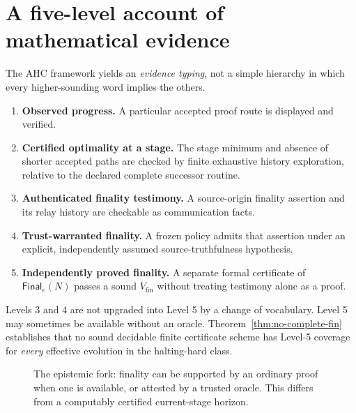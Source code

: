 \documentclass[11pt,letterpaper]{article}
\theoremstyle{definition}
\theoremstyle{remark}
\newcommand{\Fin}{\mathsf{Final}}
\begin{document}
\section{A five-level account of mathematical evidence}
The AHC framework yields an \emph{evidence typing}, not a simple hierarchy in which every higher-sounding word implies the others.
\begin{enumerate}[label=\textbf{Level \arabic*.},leftmargin=19mm]
\item \textbf{Observed progress.} A particular accepted proof route is displayed and verified.
\item \textbf{Certified optimality at a stage.} The stage minimum and absence of shorter accepted paths are checked by finite exhaustive history exploration, relative to the declared complete successor routine.
\item \textbf{Authenticated finality testimony.} A source-origin finality assertion and its relay history are checkable as communication facts.
\item \textbf{Trust-warranted finality.} A frozen policy admits that assertion under an explicit, independently assumed source-truthfulness hypothesis.
\item \textbf{Independently proved finality.} A separate formal certificate of $\Fin_e(N)$ passes a sound $V_{\mathrm{fin}}$ without treating testimony alone as a proof.
\end{enumerate}
Levels 3 and 4 are not upgraded into Level 5 by a change of vocabulary. Level 5 may sometimes be available without an oracle. Theorem~\ref{thm:no-complete-fin} establishes that no sound decidable finite certificate scheme has Level-5 coverage for \emph{every} effective evolution in the halting-hard class.

\begin{figure}[htbp]
\centering
{}
\caption{The epistemic fork: finality can be supported by an ordinary proof when one is available, or attested by a trusted oracle. This differs from a computably certified current-stage horizon.}
\end{figure}
\end{document}

